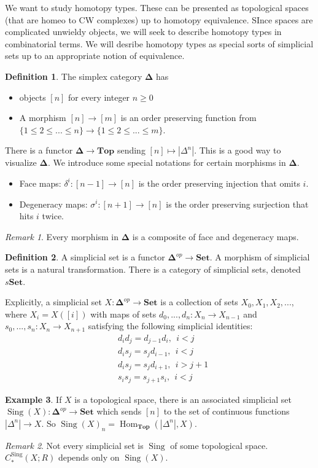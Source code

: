 \documentclass{article}
\theoremstyle{definition}
\newtheorem{defn}{Definition}[section]
\newtheorem{example}[defn]{Example}
\theoremstyle{remark}
\newtheorem{rem}{Remark}
\theoremstyle{plain}
\newcommand{\Hom}{\operatorname{Hom}}
\newcommand{\btop}{\mathbf{Top}}
\newcommand{\bdel}{\mathbf{\Delta}}
\newcommand{\sing}{\operatorname{Sing}}
\newcommand{\bset}{\mathbf{Set}}
\begin{document}
We want to study homotopy types. These can be presented as topological spaces (that are homeo to CW complexes) up to homotopy equivalence. SInce spaces are complicated unwieldy objects, we will seek to describe homotopy types in combinatorial terms. We will desribe homotopy types as special sorts of simplicial sets up to an appropriate notion of equivalence.

\begin{defn}
    The simplex category $\mathbf{\Delta}$ has 
    \begin{itemize}
        \item objects $[n]$ for every integer $n\ge 0$
        \item A morphism $[n]\to[m]$ is an order preserving function from $\{1\le2\le...\le n\}\to\{1\le 2\le...\le m\}$.
    \end{itemize}
\end{defn}
There is a functor $\mathbf{\Delta}\to\mathbf{Top}$ sending $[n]\mapsto|\Delta^n|$. This is a good way to visualize $\bdel$. We introduce some special notations for certain morphisms in $\bdel$.
\begin{itemize}
    \item Face maps: $\delta^i:[n-1]\to[n]$ is the order preserving injection that omits $i$.
    \item Degeneracy maps: $\sigma^i:[n+1]\to[n]$ is the order preserving surjection that hits $i$ twice.
\end{itemize}
\begin{rem}
    Every morphism in $\bdel$ is a composite of face and degeneracy maps.
\end{rem}

\begin{defn}
    A simplicial set is a functor $\mathbf{\Delta}^{op}\to\mathbf{Set}$. A morphism of simplicial sets is a natural transformation. There is a category of simplicial sets, denoted $s\bset$.
\end{defn}
Explicitly, a simplicial set $X:\bdel^{op}\to \bset$ is a collection of sets $X_0,X_1,X_2,...$, where $X_i=X([i])$ with maps of sets $d_0,...,d_n:X_n\to X_{n-1}$ and $s_0,...,s_n:X_{n}\to X_{n+1}$ satisfying the following simplicial identities:
\begin{align*}
    &d_id_j=d_{j-1}d_i,\ \ i<j\\
    &d_is_j=s_jd_{i-1},\ \ i<j\\
    &d_is_j=s_{j}d_{i+1},\ \ i>j+1\\
    &s_is_j=s_{j+1}s_i,\ \ i<j
\end{align*}
\begin{example}
    If $X$ is a topological space, there is an associated simplicial set $\sing(X):\mathbf{\Delta}^{op}\to \mathbf{Set}$ which sends $[n]$ to the set of continuous functions $|\Delta^n|\to X$. So $\sing(X)_n=\Hom_{\btop}(|\Delta^n|,X)$.
\end{example}
\begin{rem}
    Not every simplicial set is $\sing$ of some topological space. $C_\ast^{\sing}(X;R)$ depends only on $\sing(X)$.
\end{rem}
\end{document}
